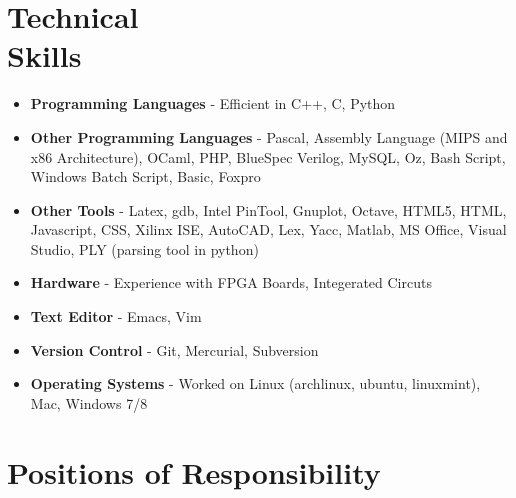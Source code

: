 \documentclass[margin,line]{resume}
\begin{document}
\begin{resume}
  \section{\mysidestyle Technical \\Skills}

  \begin{itemize}
  \item \textbf{\textsf{Programming Languages}} - Efficient in C++, C, Python
  \item \textbf{\textsf{Other Programming Languages}} - Pascal, Assembly Language (MIPS and x86 Architecture), OCaml, PHP, BlueSpec Verilog, MySQL, Oz, Bash Script, Windows Batch Script, Basic, Foxpro
  \item \textbf{\textsf{Other Tools}} - Latex, gdb, Intel PinTool, Gnuplot, Octave, HTML5, HTML, Javascript, CSS, Xilinx ISE, AutoCAD, Lex, Yacc, Matlab, MS Office, Visual Studio, PLY (parsing tool in python)
  \item \textbf{\textsf{Hardware}} - Experience with FPGA Boards, Integerated Circuts
  \item \textbf{\textsf{Text Editor}} - Emacs, Vim
  \item \textbf{\textsf{Version Control}} - Git, Mercurial, Subversion
  \item \textbf{\textsf{Operating Systems}} - Worked on Linux (archlinux, ubuntu, linuxmint), Mac, Windows 7/8
  \end{itemize}

  \section{\mysidestyle Positions of Responsibility}

  \begin{itemize}


\end{itemize}
\end{resume}
\end{document}
